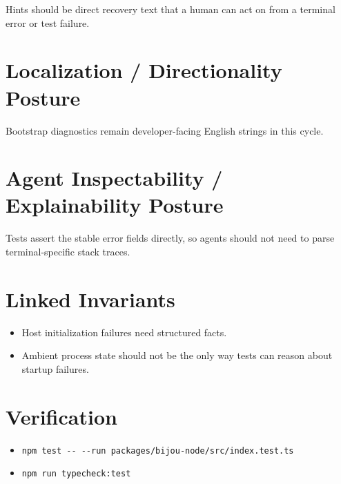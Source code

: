 Hints should be direct recovery text that a human can act on from a terminal error or test failure.

\section{Localization / Directionality Posture}\label{record-167-localization-directionality-posture}

Bootstrap diagnostics remain developer-facing English strings in this cycle.

\section{Agent Inspectability / Explainability Posture}\label{record-167-agent-inspectability-explainability-posture}

Tests assert the stable error fields directly, so agents should not need to parse terminal-specific stack traces.

\section{Linked Invariants}\label{record-167-linked-invariants}

\begin{itemize}
\tightlist
\item
  Host initialization failures need structured facts.
\item
  Ambient process state should not be the only way tests can reason about startup failures.
\end{itemize}

\section{Verification}\label{record-167-verification}

\begin{itemize}
\tightlist
\item
  \texttt{n\allowbreak{}p\allowbreak{}m\allowbreak{} \allowbreak{}t\allowbreak{}e\allowbreak{}s\allowbreak{}t\allowbreak{} \allowbreak{}-\allowbreak{}-\allowbreak{} \allowbreak{}-\allowbreak{}-\allowbreak{}r\allowbreak{}u\allowbreak{}n\allowbreak{} \allowbreak{}p\allowbreak{}a\allowbreak{}c\allowbreak{}k\allowbreak{}a\allowbreak{}g\allowbreak{}e\allowbreak{}s\allowbreak{}/\allowbreak{}b\allowbreak{}i\allowbreak{}j\allowbreak{}o\allowbreak{}u\allowbreak{}-\allowbreak{}n\allowbreak{}o\allowbreak{}d\allowbreak{}e\allowbreak{}/\allowbreak{}s\allowbreak{}r\allowbreak{}c\allowbreak{}/\allowbreak{}i\allowbreak{}n\allowbreak{}d\allowbreak{}e\allowbreak{}x\allowbreak{}.\allowbreak{}t\allowbreak{}e\allowbreak{}s\allowbreak{}t\allowbreak{}.\allowbreak{}t\allowbreak{}s}
\item
  \texttt{n\allowbreak{}p\allowbreak{}m\allowbreak{} \allowbreak{}r\allowbreak{}u\allowbreak{}n\allowbreak{} \allowbreak{}t\allowbreak{}y\allowbreak{}p\allowbreak{}e\allowbreak{}c\allowbreak{}h\allowbreak{}e\allowbreak{}c\allowbreak{}k\allowbreak{}:\allowbreak{}t\allowbreak{}e\allowbreak{}s\allowbreak{}t}
\end{itemize}

